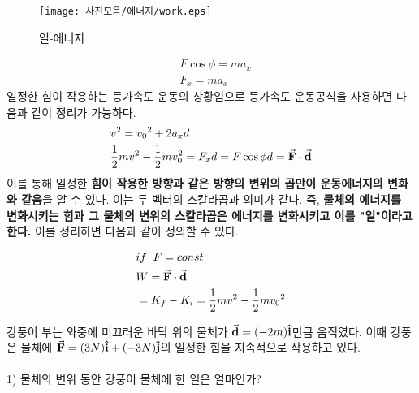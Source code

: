\begin{flushleft}
\begin{figure}[h]
  \centering
   \texttt{[image: 사진모음/에너지/work.eps]}
   \caption{일-에너지}
 \end{figure}

 \[
\begin{split}
  &F\cos{\phi}= ma_{x}\\
  &F_{x}=ma_{x}
\end{split}
\]
일정한 힘이 작용하는 등가속도 운동의 상황임으로 등가속도 운동공식을 사용하면 다음과 같이 정리가 가능하다.
\[
\begin{split}
  &v^2={v_0}^2+2a_{x}d\\
  &\frac{1}{2}mv^2-\frac{1}{2}mv_{0}^2=F_{x}d=F\cos{\phi}d=\va{F}\cdot \va{d}
\end{split}
\]
이를 통해 일정한 \textbf{힘이 작용한 방향과 같은 방향의 변위의 곱만이 운동에너지의 변화와 같음}을 알 수 있다.
이는 두 벡터의 스칼라곱과 의미가 같다. 즉,
 \textbf{물체의 에너지를 변화시키는 힘과 그 물체의 변위의 스칼라곱은 에너지를 변화시키고 이를 "일"이라고 한다.} 
이를 정리하면 다음과 같이 정의할 수 있다.

\begin{defn}[일정한 힘이 한 일]
  \begin{align}
 &if \phantom{h}F=const\\
 &W =\va{F}\cdot \va{d}\\
 &=K_f-K_i =\frac{1}{2}mv^2-\frac{1}{2}m{v_0}^2
\end{align}
\end{defn}


\begin{task}[일정한 힘이 한 일]
  \begin{flushleft}
 
  강풍이 부는 와중에 미끄러운 바닥 위의 물체가 $\va{d}=(-2m)\vu{i}$만큼 움직였다. 
  이때 강풍은 물체에 $\va{F}=(3N)\vu{i}+(-3N)\vu{j}$의 
  일정한 힘을 
  지속적으로 작용하고 있다. \\
  \phantom{h}\\
  1) 물체의 변위 동안 강풍이 물체에 한 일은 얼마인가?\\
\indent


\end{flushleft}
\end{task}
\end{flushleft}
